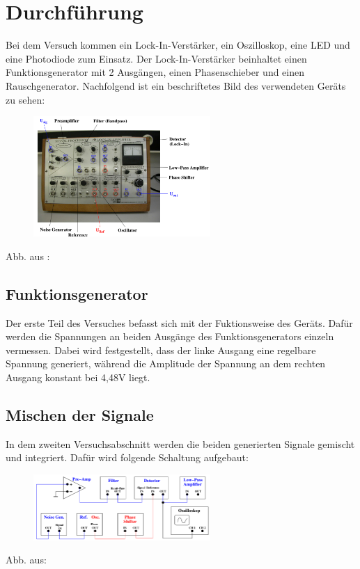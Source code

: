 \section{Durchführung}
\label{sec:Durchfuehrung}

Bei dem Versuch kommen ein Lock-In-Verstärker, ein Oszilloskop, eine
LED und eine Photodiode zum Einsatz. Der Lock-In-Verstärker beinhaltet
einen Funktionsgenerator  mit 2 Ausgängen, einen Phasenschieber und einen
Rauschgenerator. Nachfolgend ist ein beschriftetes Bild des verwendeten Geräts
zu sehen:
\begin{figure}[H]
  \centering
  \includegraphics[keepaspectratio, width=0.6\textwidth]{geraet.png}
  \label{fig:gerät}
\end{figure}
Abb. aus : \cite[3]{Anleitung}


\subsection{Funktionsgenerator}
Der erste Teil des Versuches befasst sich mit der Fuktionsweise des Geräts.
Dafür werden die Spannungen an beiden Ausgänge des Funktionsgenerators einzeln
vermessen. Dabei wird festgestellt, dass der linke Ausgang eine regelbare
Spannung generiert, während die Amplitude der Spannung an dem rechten
Ausgang konstant bei 4,48V liegt.

\subsection{Mischen der Signale}
In dem zweiten Versuchsabschnitt werden die beiden generierten Signale gemischt
und integriert. Dafür wird folgende Schaltung aufgebaut:

\begin{figure}
  \centering
  \includegraphics[keepaspectratio, width=0.6\textwidth]{Schaltung1.png}
  \label{fig:Schaltung1}
\end{figure}
Abb. aus: \cite[1]{Anleitung}\\

